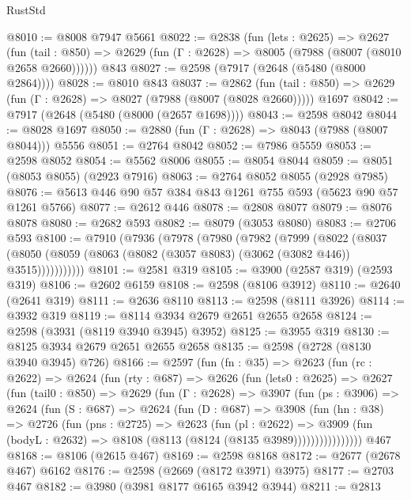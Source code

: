 \begin{lexlean}{RustStd}
\begin{coremodule}
@8010 := @8008 @7947 @5661
@8022 := @2838
    (fun (lets : @2625) =>
    @2627
      (fun (tail : @850) => @2629 (fun (Γ : @2628) => @8005 (@7988 (@8007 (@8010 @2658 @2660))))))
    @843
@8027 := @2598 (@7917 (@2648 (@5480 (@8000 @2864))))
@8028 := @8010 @843
@8037 := @2862
    (fun (tail : @850) => @2629 (fun (Γ : @2628) => @8027 (@7988 (@8007 (@8028 @2660)))))
    @1697
@8042 := @7917 (@2648 (@5480 (@8000 (@2657 @1698))))
@8043 := @2598 @8042
@8044 := @8028 @1697
@8050 := @2880 (fun (Γ : @2628) => @8043 (@7988 (@8007 @8044))) @5556
@8051 := @2764 @8042
@8052 := @7986 @5559
@8053 := @2598 @8052
@8054 := @5562 @8006
@8055 := @8054 @8044
@8059 := @8051 (@8053 @8055) (@2923 @7916)
@8063 := @2764 @8052 @8055 (@2928 @7985)
@8076 := @5613 @446 @90 @57 @384 @843 @1261 @755 @593 (@5623 @90 @57 @1261 @5766)
@8077 := @2612 @446
@8078 := @2808 @8077
@8079 := @8076 @8078
@8080 := @2682 @593
@8082 := @8079 (@3053 @8080)
@8083 := @2706 @593
@8100 := @7910
    (@7936
      (@7978
        (@7980
          (@7982
            (@7999
              (@8022
                (@8037
                  (@8050 (@8059 (@8063 (@8082 (@3057 @8083) (@3062 (@3082 @446)) @3515)))))))))))
@8101 := @2581 @319
@8105 := @3900 (@2587 @319) (@2593 @319)
@8106 := @2602 @6159
@8108 := @2598 (@8106 @3912)
@8110 := @2640 (@2641 @319)
@8111 := @2636 @8110
@8113 := @2598 (@8111 @3926)
@8114 := @3932 @319
@8119 := @8114 @3934 @2679 @2651 @2655 @2658
@8124 := @2598 (@3931 (@8119 @3940 @3945) @3952)
@8125 := @3955 @319
@8130 := @8125 @3934 @2679 @2651 @2655 @2658
@8135 := @2598 (@2728 (@8130 @3940 @3945) @726)
@8166 := @2597
    (fun (fn : @35) =>
    @2623
      (fun (rc : @2622) =>
      @2624
        (fun (rty : @687) =>
        @2626
          (fun (lets0 : @2625) =>
          @2627
            (fun (tail0 : @850) =>
            @2629
              (fun (Γ : @2628) =>
              @3907
                (fun (ps : @3906) =>
                @2624
                  (fun (S : @687) =>
                  @2624
                    (fun (D : @687) =>
                    @3908
                      (fun (hn : @38) =>
                      @2726
                        (fun (pns : @2725) =>
                        @2623
                          (fun (pl : @2622) =>
                          @3909
                            (fun (bodyL : @2632) => @8108 (@8113 (@8124 (@8135 @3989))))))))))))))))
    @467
@8168 := @8106 (@2615 @467)
@8169 := @2598 @8168
@8172 := @2677 (@2678 @467) @6162
@8176 := @2598 (@2669 (@8172 @3971) @3975)
@8177 := @2703 @467
@8182 := @3980 (@3981 @8177 @6165 @3942 @3944)
@8211 := @2813

\end{coremodule}
\end{lexlean}
